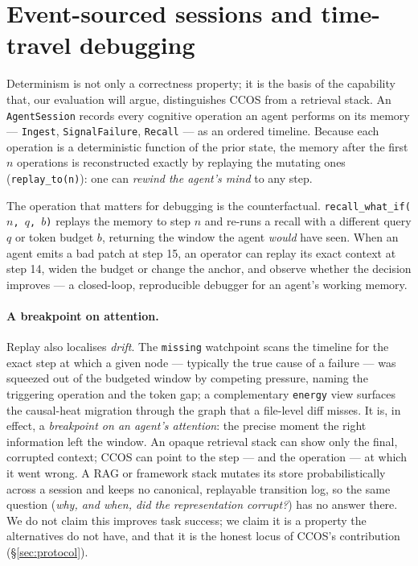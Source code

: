 \documentclass[11pt]{article}
\newcommand{\code}[1]{\texttt{#1}}
\begin{document}
\section{Event-sourced sessions and time-travel debugging}\label{sec:timetravel}

Determinism is not only a correctness property; it is the basis of the capability
that, our evaluation will argue, distinguishes CCOS from a retrieval stack. An
\code{AgentSession} records every cognitive operation an agent performs on its
memory --- \code{Ingest}, \code{SignalFailure}, \code{Recall} --- as an ordered
timeline. Because each operation is a deterministic function of the prior state,
the memory after the first $n$ operations is reconstructed exactly by replaying
the mutating ones (\code{replay\_to(n)}): one can \emph{rewind the agent's mind} to
any step.

The operation that matters for debugging is the counterfactual. \code{recall\_what\_if($n$,
$q$, $b$)} replays the memory to step $n$ and re-runs a recall with a different
query $q$ or token budget $b$, returning the window the agent \emph{would} have
seen. When an agent emits a bad patch at step 15, an operator can replay its exact
context at step 14, widen the budget or change the anchor, and observe whether the
decision improves --- a closed-loop, reproducible debugger for an agent's working
memory.

\paragraph{A breakpoint on attention.} Replay also localises \emph{drift}. The
\code{missing} watchpoint scans the timeline for the exact step at which a given
node --- typically the true cause of a failure --- was squeezed out of the budgeted
window by competing pressure, naming the triggering operation and the token gap;
a complementary \code{energy} view surfaces the causal-heat migration through the
graph that a file-level diff misses. It is, in effect, a \emph{breakpoint on an
agent's attention}: the precise moment the right information left the window. An
opaque retrieval stack can show only the final, corrupted context; CCOS can point
to the step --- and the operation --- at which it went wrong. A RAG or framework
stack mutates its store probabilistically across a
session and keeps no canonical, replayable transition log, so the same question
(\emph{why, and when, did the representation corrupt?}) has no answer there. We do
not claim this improves task success; we claim it is a property the alternatives do
not have, and that it is the honest locus of CCOS's contribution
(\S\ref{sec:protocol}).
\end{document}
